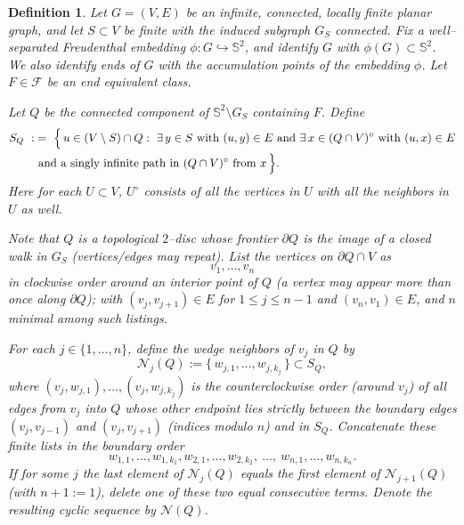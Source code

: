 \documentclass[11pt]{amsart}
\theoremstyle{plain}
\newtheorem{definition}[theorem]{Definition}
\numberwithin{equation}{section}
\numberwithin{figure}{section}
\begin{document}
\begin{definition}\label{df26}
Let \(G=(V,E)\) be an infinite, connected, locally finite planar graph, and let
\(S\subset V\) be finite with the induced subgraph \(G_S\) connected. Fix a well–separated Freudenthal
 embedding \(\phi:G\hookrightarrow\mathbb S^2\), and
identify \(G\) with \(\phi(G)\subset\mathbb S^2\). We also identify ends of $G$ with the accumulation points of the embedding $\phi$. Let $F\in \mathcal{F}$ be an end equivalent class.

Let $Q$ be the connected component of \(\mathbb S^2\!\setminus\!G_S\) 
containing $F$. Define
\begin{align}\label{dds}
S_Q\ :&=\ \Bigl\{\,u\in (V\setminus S)\cap Q:\ \exists\,y\in S\ \text{with }(u,y)\in E
\ \text{and}\ \exists\,x\in(Q\cap V)^\circ\ \text{with }(u,x)\in E\\
&\text{ and a singly infinite path in }(Q\cap V)^\circ\text{ from }x\,\Bigr\}.\notag
\end{align}
Here for each $U\subset V$, $U^{\circ}$ consists of all the vertices in $U$ with all the neighbors in $U$ as well.

Note that \(Q\) is a topological \(2\)–disc whose frontier \(\partial Q\) is the image of a closed walk in \(G_S\) (vertices/edges may repeat).
List the vertices on \(\partial Q\cap V\) as
\begin{equation}\label{dqv}
v_1,\ldots,v_n
\end{equation}
in clockwise order around an interior point of \(Q\) (a vertex may appear more than once
along \(\partial Q\)); with \((v_j,v_{j+1})\in E\) for \(1\le j\le n-1\) and \((v_n,v_1)\in E\),
and \(n\) minimal among such listings.

For each \(j\in\{1,\dots,n\}\), define the \emph{wedge neighbors} of \(v_j\) in \(Q\) by
\[
\mathcal N_j(Q):=\{\,w_{j,1},\ldots,w_{j,k_{j}}\,\}\subset S_Q,
\]
where \((v_j,w_{j,1}),\ldots,(v_j,w_{j,k_{j}})\) is the counterclockwise order (around \(v_j\))
of all edges from \(v_j\) into \(Q\) whose other endpoint lies strictly \emph{between} the boundary edges
\((v_j,v_{j-1})\) and \((v_j,v_{j+1})\) (indices modulo \(n\)) and in $S_Q$.
Concatenate these finite lists in the boundary order
\begin{equation}\label{pni}
w_{1,1},\ldots,w_{1,k_{1}},
w_{2,1},\ldots,w_{2,k_{2}},\ \ldots,\
w_{n,1},\ldots,w_{n,k_{n}}.
\end{equation}
If for some \(j\) the last element of \(\mathcal N_j(Q)\) equals the first element of \(\mathcal N_{j+1}(Q)\)
(with \(n{+}1:=1\)), delete one of these two equal consecutive terms. Denote the resulting cyclic
sequence by \(\mathcal N(Q)\).



\end{definition}
\end{document}
